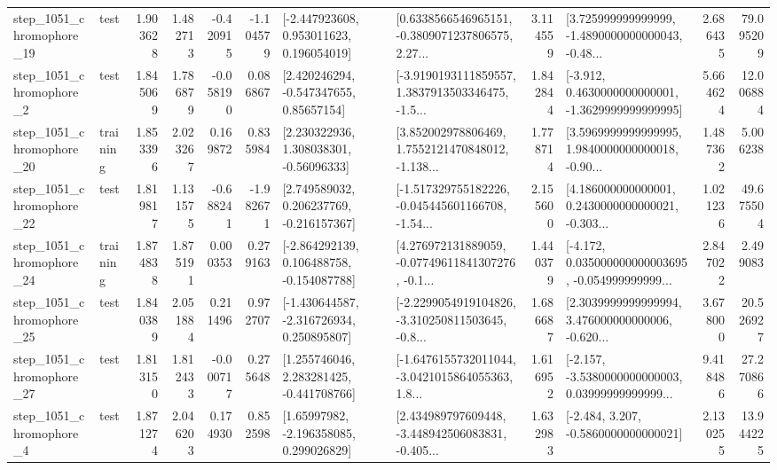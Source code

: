 \begin{tabular}{llrrrrllrlrr}
 step\_1051\_chromophore\_19 &      test &      1.903628 &    1.482713 &     -0.420915 & -1.104579 &    [-2.447923608, 0.953011623, 0.196054019] &  [0.6338566546965151, -0.3809071237806575, 2.27... &       3.114559 &  [3.725999999999999, -1.4890000000000043, -0.48... &            2.686435 &         79.095209 \\
  step\_1051\_chromophore\_2 &      test &      1.845069 &    1.786879 &     -0.058190 &  0.086867 &     [2.420246294, -0.547347655, 0.85657154] &  [-3.9190193111859557, 1.3837913503346475, -1.5... &       1.842844 &  [-3.912, 0.4630000000000001, -1.3629999999999995] &            5.664624 &         12.006884 \\
 step\_1051\_chromophore\_20 &  training &      1.853396 &    2.023267 &      0.169872 &  0.835984 &     [2.230322936, 1.308038301, -0.56096333] &  [3.852002978806469, 1.7552121470848012, -1.138... &       1.778714 &  [3.5969999999999995, 1.9840000000000018, -0.90... &            1.487362 &          5.006238 \\
 step\_1051\_chromophore\_22 &      test &      1.819817 &    1.131575 &     -0.688241 & -1.982671 &    [2.749589032, 0.206237769, -0.216157367] &  [-1.517329755182226, -0.045445601166708, -1.54... &       2.155600 &  [4.186000000000001, 0.2430000000000021, -0.303... &            1.021236 &         49.675504 \\
 step\_1051\_chromophore\_24 &  training &      1.874838 &    1.875191 &      0.000353 &  0.279163 &   [-2.864292139, 0.106488758, -0.154087788] &  [4.276972131889059, -0.07749611841307276, -0.1... &       1.440379 &  [-4.172, 0.035000000000003695, -0.054999999999... &            2.847022 &          2.499083 \\
 step\_1051\_chromophore\_25 &      test &      1.840389 &    2.051884 &      0.211496 &  0.972707 &   [-1.430644587, -2.316726934, 0.250895807] &  [-2.2299054919104826, -3.310250811503645, -0.8... &       1.686687 &  [2.3039999999999994, 3.476000000000006, -0.620... &            3.678000 &         20.526927 \\
 step\_1051\_chromophore\_27 &      test &      1.813150 &    1.812433 &     -0.000717 &  0.275648 &    [1.255746046, 2.283281425, -0.441708766] &  [-1.6476155732011044, -3.0421015864055363, 1.8... &       1.616952 &  [-2.157, -3.5380000000000003, 0.03999999999999... &            9.418486 &         27.270866 \\
  step\_1051\_chromophore\_4 &      test &      1.871274 &    2.046203 &      0.174930 &  0.852598 &     [1.65997982, -2.196358085, 0.299026829] &  [2.434989797609448, -3.448942506083831, -0.405... &       1.632983 &               [-2.484, 3.207, -0.5860000000000021] &            2.130255 &         13.944225 \\

\end{tabular}
